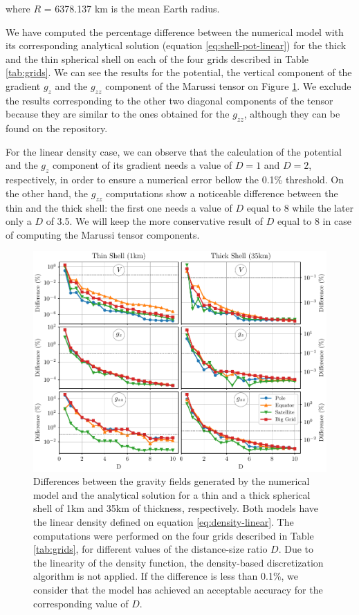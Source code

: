 \documentclass[extra]{gji}
\begin{document}
\noindent where $R$ = 6378.137 km is the mean Earth radius.

We have computed the percentage difference between the numerical model 
with its corresponding analytical solution (equation 
\ref{eq:shell-pot-linear}) for the thick and the thin spherical shell 
on each of the four grids described in Table \ref{tab:grids}.
We can see the results for the potential, the vertical component of the 
gradient $g_z$ and the $g_{zz}$ component of the Marussi tensor on 
Figure \ref{fig:D-linear}.
We exclude the results corresponding to the other two diagonal 
components of the tensor because they are similar to the ones obtained 
for the $g_{zz}$, although they can be found on the repository. 

For the linear density case, we can observe that the calculation of the 
potential and the $g_z$ component of its gradient needs a value of 
$D=1$ and $D=2$, respectively, in order to ensure a numerical error 
bellow the 0.1\% threshold.
On the other hand, the $g_{zz}$ computations show a noticeable 
difference between the thin and the thick shell: the first one needs a 
value of $D$ equal to 8 while the later only a $D$ of 3.5.
We will keep the more conservative result of $D$ equal to 8 in case of 
computing the Marussi tensor components.

\begin{figure}
\centering
\includegraphics[width=\linewidth]{figures/linear-D.pdf}
\caption{
    Differences between the gravity fields generated by the numerical model 
    and the analytical solution for a thin and a thick spherical shell of 1km 
    and 35km of thickness, respectively.
    Both models have the linear density defined on equation 
    \ref{eq:density-linear}.
    The computations were performed on the four grids described in 
    Table \ref{tab:grids}, for different values of the distance-size 
    ratio $D$.
    Due to the linearity of the density function, the density-based 
    discretization algorithm is not applied.
    If the difference is less than 0.1\%, we consider that the model 
    has achieved an acceptable accuracy for the corresponding value of 
    $D$.
    }
\label{fig:D-linear}
\end{figure}
\end{document}
